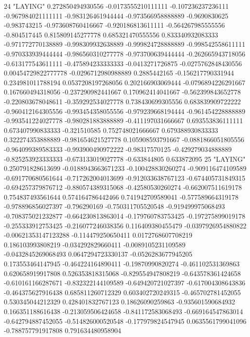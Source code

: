 24 "LAYING" 0.272850494930556 -0.0173555210111111 -0.107236237236111 -0.967984021111111 -0.983126461944444 -0.973566958888889 -0.9690830625 -0.983743215 -0.973608760416667 -0.920186813611111 -0.564267985555556 -0.804517445 0.815809145277778 0.685321470555556 0.833340932083333 -0.971772770138889 -0.998309932638889 -0.999824728888889 -0.998542558611111 -0.970333939444444 -0.986560310277778 -0.973700639444444 -0.262665943718056 -0.613177543611111 -0.475894233333333 -0.0413271726875 -0.0275762848430556 0.00454729822777778 -0.0296712980988889 0.2885442165 -0.156217790331944 0.234981011788194 0.0537208197268056 0.202166903069444 -0.0796894226291667 0.167660494318056 -0.237290982441667 0.170962414041667 -0.562399843652778 -0.220803678048611 -0.359292534027778 0.738430699305556 0.683839909722222 -0.960412164305556 -0.993454358055556 -0.979239668194444 -0.961454228888889 -0.993541224027778 -0.980281883888889 -0.411197031666667 0.693553836111111 0.673407990833333 -0.321510585 0.752748021666667 0.679388930833333 0.322274353888889 -0.981654621527778 0.105908593791667 -0.0881866051805556 -0.964099389583333 -0.993900490972222 -0.98317570125 -0.429279034888889 -0.825253923333333 -0.673133019027778 -0.633844805 0.633872095
25 "LAYING" 0.250791828613699 -0.0188943663671233 -0.100428830260274 -0.909116474109589 -0.691770680561644 -0.717262004013699 -0.912033638767123 -0.674405731849315 -0.694257379876712 -0.880574389315068 -0.42580530260274 -0.662007511619178 0.754837493561644 0.574164786442466 0.741942709589041 -0.577589664319178 -0.978896856027397 -0.796290169 -0.750311705520548 -0.919499975068493 -0.708375021232877 -0.664230813863014 -0.179760783753425 -0.197275899019178 -0.255333912753425 -0.216077246038356 0.116409380455479 -0.0397926954880822 -0.00621353147123288 -0.114479250650411 0.0172768607708219 0.186103993808219 -0.034292829660411 -0.0089105231109589 -0.0432845269068493 0.0647294723330137 -0.0526283677945205 0.173553464147945 -0.464224164890411 -0.19870990820274 -0.461102531369863 0.620658919917808 0.526353818315068 -0.829554947808219 -0.643578361424658 -0.610161166287671 -0.832322144109589 -0.649420721027397 -0.617004308643836 -0.464375627916438 0.685811260712329 0.603402720249315 -0.465702781452055 0.530345044212329 0.428401832767123 0.18626090259863 -0.935601590684932 0.166351188616438 -0.213059506424658 -0.841172583068493 -0.669164547863014 -0.642794887452055 -0.514826000520548 -0.177979824547945 0.0635561799041096 -0.788757791917808 0.791634480958904
